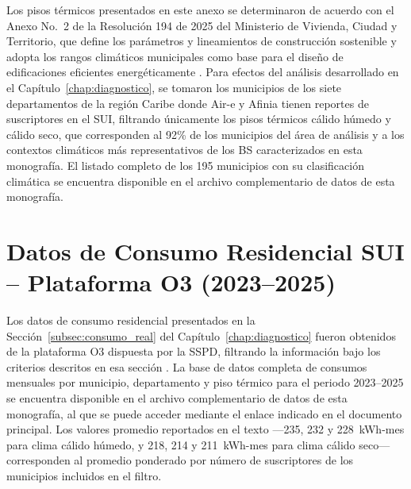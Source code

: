 Los pisos térmicos presentados en este anexo se determinaron de acuerdo con el Anexo No.\ 2 de la Resolución 194 de 2025 del Ministerio de Vivienda, Ciudad y Territorio, que define los parámetros y lineamientos de construcción sostenible y adopta los rangos climáticos municipales como base para el diseño de edificaciones eficientes energéticamente \parencite{UPME2025}. Para efectos del análisis desarrollado en el Capítulo~\ref{chap:diagnostico}, se tomaron los municipios de los siete departamentos de la región Caribe donde Air-e y Afinia tienen reportes de suscriptores en el SUI, filtrando únicamente los pisos térmicos cálido húmedo y cálido seco, que corresponden al 92\% de los municipios del área de análisis y a los contextos climáticos más representativos de los BS caracterizados en esta monografía. El listado completo de los 195 municipios con su clasificación climática se encuentra disponible en el archivo complementario de datos de esta monografía.


\chapter{Datos de Consumo Residencial SUI -- Plataforma O3 (2023--2025)}
\label{anx:consumo_sspd}

Los datos de consumo residencial presentados en la Sección~\ref{subsec:consumo_real} del Capítulo~\ref{chap:diagnostico} fueron obtenidos de la plataforma O3 dispuesta por la SSPD, filtrando la información bajo los criterios descritos en esa sección \parencite{SSPD2025}. La base de datos completa de consumos mensuales por municipio, departamento y piso térmico para el periodo 2023--2025 se encuentra disponible en el archivo complementario de datos de esta monografía, al que se puede acceder mediante el enlace indicado en el documento principal. Los valores promedio reportados en el texto —235, 232 y 228~kWh-mes para clima cálido húmedo, y 218, 214 y 211~kWh-mes para clima cálido seco— corresponden al promedio ponderado por número de suscriptores de los municipios incluidos en el filtro.